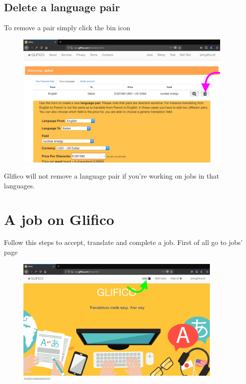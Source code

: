 \documentclass[11 pt, a4paper]{article}
\begin{document}
\clearpage
\subsection{Delete a language pair}
To remove a pair simply click the bin icon
\begin{figure}[H]
\centering
\includegraphics[width=0.95\textwidth]{translator_pair8.png}
\end{figure}

Glifico will not remove a language pair if you're working on jobs in that languages.

\clearpage
\section{A job on Glifico}
Follow this steps to accept, translate and complete a job.
First of all go to jobs' page
\begin{figure}[H]
\centering
\includegraphics[width=0.9\textwidth]{translator_job0.png}
\end{figure}
\end{document}
